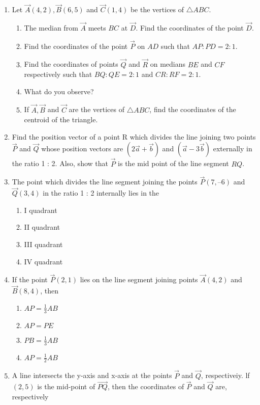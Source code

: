 \begin{enumerate}[label=\thesubsection.\arabic*,ref=\thesubsection.\theenumi]
\\
\solution
	
\item Let $\vec{A}(4, 2), \vec{B}(6, 5)$  and $ \vec{C}(1, 4)$ be the vertices of $\triangle ABC$.
\begin{enumerate}
\item The median from $\vec{A}$ meets $BC$ at $\vec{D}$. Find the coordinates of the point $\vec{D}$.
\item Find the coordinates of the point $\vec{P}$ on $AD$ such that $AP : PD = 2 : 1$.
\item Find the coordinates of points $\vec{Q}$ and $\vec{R}$ on medians $BE$ and $CF$ respectively such that $BQ : QE = 2 : 1$  and  $CR : RF = 2 : 1$.
\item What do you observe?
\item If $\vec{A}, \vec{B}$ and $\vec{C}$  are the vertices of $\triangle ABC$, find the coordinates of the centroid of the triangle.
\end{enumerate}
\solution
	
\item Find the position vector of a point R which divides the line joining two points $\vec{P}$ and $\vec{Q}$ whose position vectors are $(2\vec{a}+\vec{b})$ and $(\vec{a}-3\vec{b})$
externally in the ratio 1 : 2. Also, show that $\vec{P}$ is the mid point of the line segment $RQ$.\\
	\solution
		
\item The point which divides the line segment joining the points $\vec{P} (7, –6) $  and  $\vec{Q}(3, 4)$ in the 
ratio 1 : 2 internally lies in the
\begin{enumerate}
\item I quadrant
\item  II quadrant
\item  III quadrant
\item  IV quadrant
\end{enumerate}
\item If the point $\vec{P} (2, 1)$ lies on the line segment joining points $\vec{A} (4, 2)$  and $ \vec{B} (8, 4)$,
then
\begin{enumerate}
	\item $AP =\frac{1}{3}{AB}$ 
\item ${AP}={PE}$
\item ${PB}=\frac{1}{3}{AB}$
\item${AP}=\frac{1}{2}{AB}$
 \end{enumerate}
\item A line intersects the y-axis and x-axis at the points $\vec{P}$  and $\vec{Q}$, respectiveiy. lf $(2,5)$ is the mid-point of $\vec{PQ}$, then the coordinates of $\vec{P}$ and $ \vec{Q}$ are, respectively

\end{enumerate}

